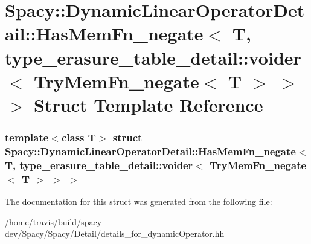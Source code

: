 \hypertarget{structSpacy_1_1DynamicLinearOperatorDetail_1_1HasMemFn__negate_3_01T_00_01type__erasure__table__798d97db7f6c34a6474b5f3226ac00bd}{\section{\-Spacy\-:\-:\-Dynamic\-Linear\-Operator\-Detail\-:\-:\-Has\-Mem\-Fn\-\_\-negate$<$ \-T, type\-\_\-erasure\-\_\-table\-\_\-detail\-:\-:voider$<$ \-Try\-Mem\-Fn\-\_\-negate$<$ \-T $>$ $>$ $>$ \-Struct \-Template \-Reference}
\label{structSpacy_1_1DynamicLinearOperatorDetail_1_1HasMemFn__negate_3_01T_00_01type__erasure__table__798d97db7f6c34a6474b5f3226ac00bd}
}
\subsubsection*{template$<$class T$>$ struct Spacy\-::\-Dynamic\-Linear\-Operator\-Detail\-::\-Has\-Mem\-Fn\-\_\-negate$<$ T, type\-\_\-erasure\-\_\-table\-\_\-detail\-::voider$<$ Try\-Mem\-Fn\-\_\-negate$<$ T $>$ $>$ $>$}



\-The documentation for this struct was generated from the following file\-:\begin{DoxyCompactItemize}
\item 
/home/travis/build/spacy-\/dev/\-Spacy/\-Spacy/\-Detail/details\-\_\-for\-\_\-dynamic\-Operator.\-hh\end{DoxyCompactItemize}
